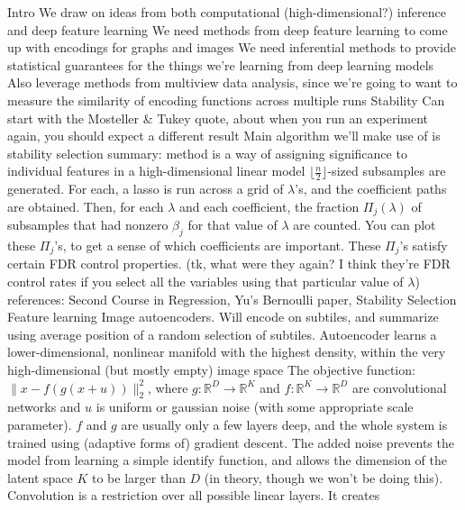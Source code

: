 \documentclass[11pt]{article}
\begin{document}
\begin{outline}
\1 Intro
  \2 We draw on ideas from both computational (high-dimensional?) inference and
  deep feature learning
    \3 We need methods from deep feature learning to come up with encodings for
    graphs and images
    \3 We need inferential methods to provide statistical guarantees for the
    things we're learning from deep learning models
  \2 Also leverage methods from multiview data analysis, since we're going to
  want to measure the similarity of encoding functions across multiple runs
\1 Stability
  \2 Can start with the Mosteller \& Tukey quote, about when you run an
  experiment again, you should expect a different result
  \2 Main algorithm we'll make use of is stability selection
    \3 summary: method is a way of assigning significance to individual features
    in a high-dimensional linear model
    \3 $\lfloor \frac{n}{2} \rfloor$-sized subsamples are generated. For each, a
    lasso is run across a grid of $\lambda$'s, and the coefficient paths are
    obtained. Then, for each $\lambda$ and each coefficient, the fraction
    $\Pi_{j}\left(\lambda\right)$ of subsamples that had nonzero $\beta_{j}$ for
    that value of $\lambda$ are counted. You can plot these $\Pi_{j}$'s, to get
    a sense of which coefficients are important.
    \3 These $\Pi_{j}$'s satisfy certain FDR control properties. (tk, what were
    they again? I think they're FDR control rates if you select all the
    variables using that particular value of $\lambda$)
  \2 references: Second Course in Regression, Yu's Bernoulli paper, Stability Selection
\1 Feature learning
  \2 Image autoencoders. Will encode on subtiles, and summarize using average
  position of a random selection of subtiles.
    \3 Autoencoder learns a lower-dimensional, nonlinear manifold with the
    highest density, within the very high-dimensional (but mostly empty) image
    space
    \3 The objective function: $\|x - f\left(g\left(x +
    u\right)\right)\|_{2}^{2}$, where $g : \mathbb{R}^{D} \to \mathbb{R}^{K}$
    and $f: \mathbb{R}^{K} \to \mathbb{R}^{D}$ are convolutional networks and
    $u$ is uniform or gaussian noise (with some appropriate scale parameter).
    \3 $f$ and $g$ are usually only a few layers deep, and the whole system is
    trained using (adaptive forms of) gradient descent.
    \3 The added noise prevents the model from learning a simple identify
    function, and allows the dimension of the latent space $K$ to be larger than
    $D$ (in theory, though we won't be doing this).
    \3 Convolution is a restriction over all possible linear layers. It creates

\end{outline}
\end{document}
